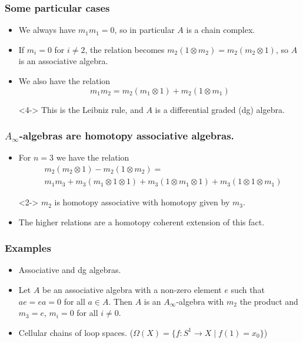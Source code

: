 \documentclass{beamer}
\theoremstyle{definition}
\begin{document}
\begin{frame}
\frametitle{Some particular cases}
\begin{itemize}
\item<1-> We always have $m_1m_1=0$, so in particular $A$ is a chain complex. %
\item<2-> If $m_i=0$ for $i\neq 2$, the relation becomes $m_2(1\otimes m_2)=m_2(m_2\otimes 1)$, so $A$ is an associative algebra.
\item<3-> We also have the relation \[m_1m_2=m_2(m_1\otimes 1)+m_2(1\otimes m_1)\]%
\item[]<4-> This is the Leibniz rule, and $A$ is a differential graded (dg) algebra.

\end{itemize}
\end{frame}


\begin{frame}
\frametitle{$A_\infty$-algebras are homotopy associative algebras.}
\begin{itemize}
\item<1-> For $n=3$ we have the relation
\begin{align*}
&m_2(m_2\otimes 1)-m_2(1\otimes m_2)=\\ %
&m_1m_3+m_3(m_1\otimes 1\otimes 1)+m_3(1\otimes m_1\otimes 1)+m_3(1\otimes 1\otimes m_1)
\end{align*}
\item[]<2-> $m_2$ is homotopy associative with homotopy given by $m_3$.  %
\item<3-> The higher relations are a homotopy coherent extension of this fact. %
\end{itemize}
\end{frame}



\begin{frame}
\frametitle{Examples}
\begin{itemize}
\item<1-> Associative and  dg algebras. %
\item<2-> Let $A$ be an associative algebra with a non-zero element $e$ such that $ae=ea=0$ for all $a\in A$. Then $A$ is an $A_\infty$-algebra with $m_2$ the product and $m_3=e$, $m_i=0$ for all $i\neq 0$.%
\item<3-> Cellular chains of loop spaces. ($\Omega(X)=\{f:S^1\to X\mid f(1)=x_0\}$)%

\end{itemize}
\end{frame}
\end{document}
